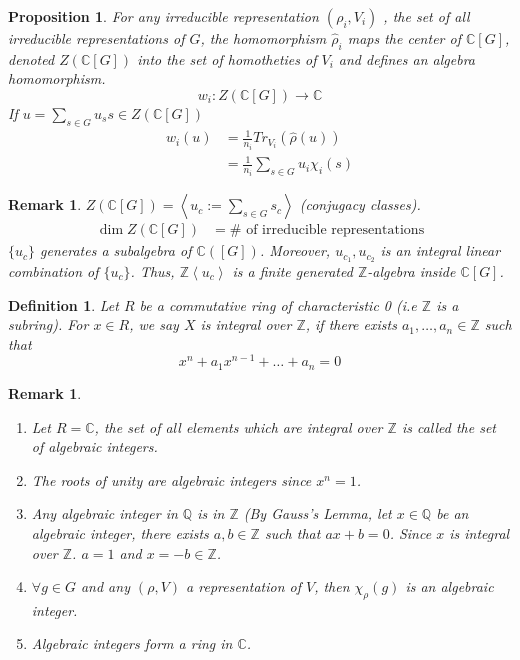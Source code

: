 \documentclass[letterpaper, leqno, 12pt]{article}
\newcommand{\fin}{\qquad \quad \hfill \framebox[1.75mm][l]{\,}}
\newcommand{\bZ}{\mathbb{Z}}
\newcommand{\bQ}{\mathbb{Q}}
\providecommand{\ip}[1]{\left\langle #1 \right\rangle}
\newcommand{\bC} {\mathbb{C}}
\theoremstyle{stdthm}
\newtheorem{prop}[thm]{Proposition}
\theoremstyle{stddef}
\newtheorem{defn}[thm]{Definition}
\newtheorem{rem}[thm]{Remark} %
\theoremstyle{stdnonum}
\theoremstyle{stdqands}
\theoremstyle{stdbold}
\begin{document}
\begin{prop}
For any irreducible representation $(\rho_i, V_i)$ , the set of all irreducible representations of $G$, the homomorphism $\hat{\rho}_i$ maps the center of $\bC[G]$, denoted $Z(\bC[G])$ into the set of homotheties of $V_i$ and defines an algebra homomorphism. 
\[ w_i: Z(\bC[G]) \rightarrow \bC \]
If $u = \sum_{s \in G} u_s s \in Z(\bC[G])$ 
\begin{align*}
w_i(u) &= \frac{1}{n_i} Tr_{V_i} (\hat{\rho}(u)) \\
&= \frac{1}{n_i} \sum_{s\in G} u_i \chi_i(s) 
\end{align*}
\end{prop}

\begin{rem}
$Z(\bC[G])  = \ip{u_c:=\sum_{s \in G} s_c}$ (conjugacy classes). 
\begin{align*}
\dim Z(\bC[G]) &= \# \mbox{ of irreducible representations}
\end{align*}
$\{u_c\}$ generates a subalgebra of $\bC([G])$. Moreover, $u_{c_1}, u_{c_2}$ is an integral linear combination of $\{u_c\}$. Thus, $\bZ \ip{u_c}$ is a finite generated $\bZ$-algebra inside $\bC[G]$. 
\end{rem}

\begin{defn}
Let $R$ be a commutative ring of characteristic 0 (i.e $\bZ$ is a subring). For $x \in R$, we say $X$ is integral over $\bZ$, if there exists $a_1,\dots, a_n \in \bZ$ such that 
\[ x^n + a_1 x^{n-1} + \dots + a_n = 0\] 
\end{defn}


\begin{rem}
\begin{enumerate}
\item Let $R = \bC$, the set of all elements which are integral over $\bZ$ is called the set of algebraic integers. 
\item The roots of unity are algebraic integers since $x^n = 1$. 
\item Any algebraic integer in $\bQ$ is in $\bZ$ (By Gauss's Lemma, let $x \in \bQ$ be an algebraic integer, there exists $a,b \in \bZ$ such that $ax + b = 0$. Since $x$ is integral over $\bZ$. $a = 1$ and $x = -b \in \bZ$. 
\item $\forall g \in G$ and any $(\rho,V)$ a representation of $V$, then $\chi_\rho(g)$ is an algebraic integer. 
\item Algebraic integers form a ring in $\bC$. 
\end{enumerate}
\end{rem}
\end{document}
